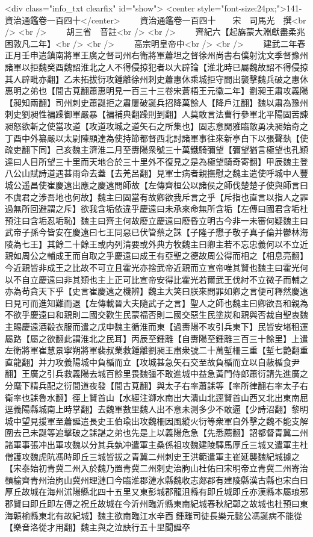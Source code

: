 <div class="info_txt clearfix" id="show">
<center style="font-size:24px;">141-資治通鑑卷一百四十</center>
  　　資治通鑑卷一百四十　　宋　司馬光　撰<br />
<br />
　　胡三省　音註<br />
<br />
　　齊紀六【起旃蒙大淵獻盡柔兆困敦凡二年】<br />
<br />
　　高宗明皇帝中<br />
<br />
　　建武二年春正月壬申遣鎮南將軍王廣之督司州右衛將軍蕭坦之督徐州尚書右僕射沈文季督豫州諸軍以拒魏癸酉魏詔淮北之人不得侵掠犯者以大辟論【淮北時已屬魏故詔不得侵掠其人辟毗亦翻】乙未拓拔衍攻鍾離徐州刺史蕭惠休乘城拒守間出襲擊魏兵破之惠休惠明之弟也【間古莧翻蕭惠明見一百三十三卷宋蒼梧王元徽二年】劉昶王肅攻義陽【昶知兩翻】司州刺史蕭誕拒之肅屢破誕兵招降萬餘人【降戶江翻】魏以肅為豫州刺史劉昶性褊躁御軍嚴暴【褊補典翻躁則到翻】人莫敢言法曹行參軍北平陽固苦諫昶怒欲斬之使當攻道【攻道攻城之道矢石之所集也】固志意閒雅臨敵勇决昶始奇之丁酉中外纂嚴以太尉陳顯達為使持節都督西北討諸軍事往來新亭白下以張聲埶【使疏吏翻下同】己亥魏主濟淮二月至夀陽衆號三十萬鐵騎彌望【彌望猶言極望也孔穎達曰人目所望三十里而天地合於三十里外不復見之是為極望騎奇寄翻】甲辰魏主登八公山賦詩道遇甚雨命去蓋【去羌呂翻】見軍士病者親撫慰之魏主遣使呼城中人豐城公遥昌使崔慶遠出應之慶遠問師故【左傳齊桓公以諸侯之師伐楚楚子使與師言曰不虞君之涉吾地也何故】魏主曰固當有故卿欲我斥言之乎【斥指也直言以指人之罪過無所回避謂之斥】欲我含垢依違乎慶遠曰未承來命無所含垢【左傳曰國君含垢杜預注曰含垢忍垢恥】魏主曰齊主何故廢立慶遠曰廢昏立明古今非一未審何疑魏主曰武帝子孫今皆安在慶遠曰七王同惡已伏管蔡之誅【子隆子懋子敬子真子倫并鬱林海陵為七王】其餘二十餘王或内列清要或外典方牧魏主曰卿主若不忘忠義何以不立近親如周公之輔成王而自取之乎慶遠曰成王有亞聖之德故周公得而相之【相息亮翻】今近親皆非成王之比故不可立且霍光亦捨武帝近親而立宣帝唯其賢也魏主曰霍光何以不自立慶遠曰非其類也主上正可比宣帝安得比霍光若爾武王伐紂不立微子而輔之亦為苟貪天下乎【史言崔慶遠之機辨】魏主大笑曰朕來問罪如卿之言便可釋然慶遠曰見可而進知難而退【左傳載晉大夫隨武子之言】聖人之師也魏主曰卿欲吾和親為不欲乎慶遠曰和親則二國交歡生民蒙福否則二國交惡生民塗炭和親與否裁自聖衷魏主賜慶遠酒殽衣服而遣之戊申魏主循淮而東【過夀陽不攻引兵東下】民皆安堵租運屬路【屬之欲翻此謂淮北之民耳】丙辰至鍾離【自夀陽至鍾離三百三十餘里】上遣左衛將軍崔慧景寧朔將軍裴叔業救鍾離劉昶王肅衆號二十萬塹柵三重【塹七艷翻重直龍翻】并力攻義陽城中負楯而立【攻城甚急矢石交至故負楯而立以自蔽楯食尹翻】王廣之引兵救義陽去城百餘里畏魏彊不敢進城中益急黃門侍郎蕭衍請先進廣之分麾下精兵配之衍間道夜發【間古莧翻】與太子右率蕭誄等【率所律翻右率太子右衛率也誄魯水翻】徑上賢首山【水經注溮水南出大潰山北逕賢首山西又北出東南屈逕義陽縣城南上時掌翻】去魏軍數里魏人出不意未測多少不敢逼【少詩沼翻】黎明城中望見援軍至蕭誕遣長史王伯瑜出攻魏柵因風縱火衍等衆軍自外擊之魏不能支解圍去己未誕等追擊破之誄諶之弟也先是上以義陽危急【先悉薦翻】詔都督青冀二州諸軍事張冲出軍攻魏以分其兵埶冲遣軍主桑係祖攻魏建陵驛馬厚丘三城又遣軍主杜僧護攻魏虎阬馮時即丘三城皆拔之青冀二州刺史王洪範遣軍主崔延襲魏紀城據之【宋泰始初青冀二州入於魏乃置青冀二州刺史治朐山杜佑曰宋明帝立青冀二州寄治贑榆齊青州治朐山冀州理漣口今臨淮郡漣水縣魏收志郯郡有建陵縣漢古縣也宋白曰厚丘故城在海州沭陽縣北四十五里又東彭城郡龍沮縣有即丘城即丘亦漢縣本屬琅邪郡賢曰即丘即左傳之祝丘故城在今沂州臨沂縣東南紀城春秋紀鄣之故城也杜預曰東海贑榆縣東北有故紀城】魏主欲南臨江水辛酉鍾離司徒長樂元懿公馮誕病不能從【樂音洛從才用翻】魏主與之泣訣行五十里聞誕卒